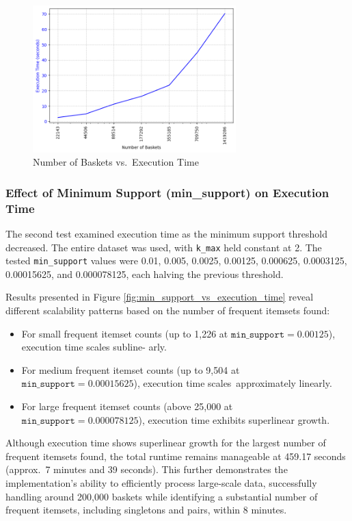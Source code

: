 \documentclass{Class/julia}
\begin{document}
\begin{figure}[!ht]
    \centering
    \includegraphics[width=0.7\textwidth]{n_baskets_vs_execution_time.png}
    \caption{Number of Baskets vs.\ Execution Time}
    \label{fig:n_baskets_vs_execution_time}
\end{figure}

\subsubsection{Effect of Minimum Support (min\_support) on Execution Time}

The second test examined execution time as the minimum support threshold decreased. The entire dataset was used, with \texttt{k\_max} held constant at 2. The tested \texttt{min\_support} values were 0.01, 0.005, 0.0025, 0.00125, 0.000625, 0.0003125, 0.00015625, and 0.000078125, each halving the previous threshold.  

Results presented in Figure \ref{fig:min_support_vs_execution_time} reveal different scalability patterns based on the number of frequent itemsets found:  
\begin{itemize}
    \item For small frequent itemset counts (up to 1,226 at \( \texttt{min\_support} = 0.00125 \)), execution time scales subline- arly.  
    \item For medium frequent itemset counts (up to 9,504 at \( \texttt{min\_support} = 0.00015625 \)), execution time scales~approximately linearly.  
    \item For large frequent itemset counts (above 25,000 at \( \texttt{min\_support} = 0.000078125 \)), execution time exhibits superlinear growth.  
\end{itemize}

Although execution time shows superlinear growth for the largest number of frequent itemsets found, the total runtime remains manageable at 459.17 seconds (approx.\ 7 minutes and 39 seconds). This further demonstrates the implementation's ability to efficiently process large-scale data, successfully handling around 200,000 baskets while identifying a substantial number of frequent itemsets, including singletons and pairs, within 8 minutes.
\end{document}
